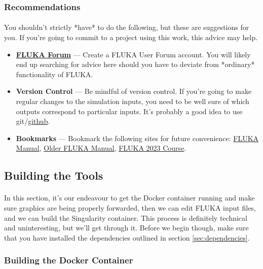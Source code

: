  \subsubsection{Recommendations}
    \paragraph{}
    You shouldn't strictly *have* to do the following, but these are suggestions for you. If you're going to commit to a project using this work, this advice may help.
    \begin{itemize}
        \item{\href{https://fluka-forum.web.cern.ch/}{\textbf{FLUKA Forum}}} — Create a FLUKA User Forum account. You will likely end up searching for advice here should you have to deviate from *ordinary* functionality of FLUKA.
        \item{\textbf{Version Control}} — Be mindful of version control. If you're going to make regular changes to the simulation inputs, you need to be well sure of which outputs correspond to particular inputs. It's probably a good idea to use git/\href{https://www.github.com}{github}.
        \item{\textbf{Bookmarks}} — Bookmark the following sites for future convenience: \href{https://flukafiles.web.cern.ch/manual/index.html}{FLUKA Manual}, \href{http://www.fluka.org/fluka.php?id=manuals&mm2=3}{Older FLUKA Manual}, \href{https://indico.cern.ch/event/1200922/timetable/#20230605}{FLUKA 2023 Course}.
    \end{itemize}

\subsection{Building the Tools}
\paragraph{}
In this section, it's our endeavour to get the Docker container running and make sure graphics are being properly forwarded, then we can edit FLUKA input files, and we can build the Singularity container. This process is definitely technical and uninteresting, but we'll get through it. Before we begin though, make sure that you have installed the dependencies outlined in section \ref{sec:dependencies}.

    \subsubsection{Building the Docker Container}
